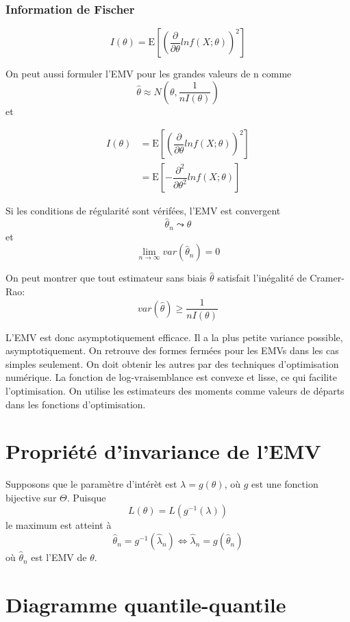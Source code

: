 \documentclass[]{book}
\theoremstyle{definition}
\theoremstyle{definition}
\theoremstyle{definition}
\theoremstyle{remark}
\begin{document}
\subsubsection*{Information de Fischer}\label{information-de-fischer}

\[
I(\theta)=\text{E}\left [\left (\dfrac{\partial}{\partial \theta}ln f(X;\theta)\right )^2\right ]
\]

On peut aussi formuler l'EMV pour les grandes valeurs de n comme \[
\hat{\theta}\approx N\left(\theta,\dfrac{1}{nI(\theta)}\right)
\] et

\begin{align*}
I(\theta)& =\text{E}\left [\left (\dfrac{\partial}{\partial \theta}ln f(X;\theta)\right )^2\right ]\\
& =\text{E}\left [-\dfrac{{\partial}^2}{\partial {\theta}^2}ln f(X;\theta)\right ]
\end{align*}

Si les conditions de régularité sont vérifées, l'EMV est convergent \[
\hat{\theta}_n\leadsto \theta
\] et \[
\lim_{n\rightarrow\infty} var(\hat{\theta}_n)=0
\]

On peut montrer que tout estimateur sans biais \(\hat{\theta}\)
satisfait l'inégalité de Cramer-Rao: \[
var(\hat{\theta}) \geq \dfrac{1}{nI(\theta)}
\]

L'EMV est donc asymptotiquement efficace. Il a la plus petite variance
possible, asymptotiquement. On retrouve des formes fermées pour les EMVs
dans les cas simples seulement. On doit obtenir les autres par des
techniques d'optimisation numérique. La fonction de log-vraisemblance
est convexe et lisse, ce qui facilite l'optimisation. On utilise les
estimateurs des moments comme valeurs de départs dans les fonctions
d'optimisation.

\section{Propriété d'invariance de
l'EMV}\label{propriete-dinvariance-de-lemv}

Supposons que le paramètre d'intérèt est \(\lambda=g(\theta)\), où \(g\)
est une fonction bijective sur \(\Theta\). Puisque \[
L(\theta)=L(g^{-1}(\lambda))
\] le maximum est atteint à \[
\hat{\theta}_n=g^{-1}(\hat{\lambda}_n)\Leftrightarrow \hat{\lambda}_n=g(\hat{\theta}_n)
\] où \(\hat{\theta}_n\) est l'EMV de \(\theta\).

\section{Diagramme quantile-quantile}\label{diagramme-quantile-quantile}
\end{document}
